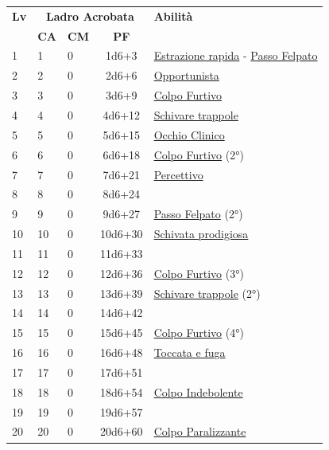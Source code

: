 {\begin{multicols}{2}

\noindent\begin{tabularx}{\linewidth}{p{0.3cm}|p{0.3cm}p{0.3cm}c|X|}
	\toprule
 \rowcolor{gray!20}	\textbf{Lv} & \multicolumn{3}{c|}{\textbf{Ladro Acrobata}} & \textbf{Abilità} \\
& \centering\arraybackslash \textbf{CA} & \centering\arraybackslash \textbf{CM} & \centering\arraybackslash \textbf{PF} & \\
	\toprule
	1 &1	& 0	&	1d6+3	&\hyperlink{Estrazione rapida}{Estrazione rapida} - \hyperlink{Passo Felpato}{Passo Felpato}\\
 \rowcolor{gray!20}2	&	2	& 0	&	2d6+6	&\hyperlink{Opportunista}{Opportunista}\\
	3	&	3	& 0	&	3d6+9	&\hyperlink{Colpo Furtivo}{Colpo Furtivo}\\
 \rowcolor{gray!20}4	&	4	& 0	&	4d6+12	&\hyperlink{Schivare trappole}{Schivare trappole}\\
	5	&	5	& 0	&	5d6+15	&\hyperlink{Occhio Clinico}{Occhio Clinico}\\
 \rowcolor{gray!20}6	&	6	& 0	&	6d6+18	&\hyperlink{Colpo Furtivo}{Colpo Furtivo} (2°)\\
	7	&	7	& 0	&	7d6+21	&\hyperlink{Percettivo}{Percettivo}\\
 \rowcolor{gray!20}8	&	8	& 0	&	8d6+24	&\\
	9	&	9	& 0	&	9d6+27	&\hyperlink{Passo Felpato}{Passo Felpato} (2°)\\
 \rowcolor{gray!20}10	&	10	& 0	&	10d6+30	&\hyperlink{Schivata prodigiosa}{Schivata prodigiosa}\\
	11	&	11	& 0	&	11d6+33	&\\
 \rowcolor{gray!20}12	&	12	& 0	&	12d6+36	&\hyperlink{Colpo Furtivo}{Colpo Furtivo} (3°)\\
	13	&	13	& 0	&	13d6+39	&\hyperlink{Schivare trappole}{Schivare trappole} (2°)\\
 \rowcolor{gray!20}14	&	14	& 0	&	14d6+42	&\\
	15	&	15	& 0	&	15d6+45	&\hyperlink{Colpo Furtivo}{Colpo Furtivo} (4°)\\
 \rowcolor{gray!20}16	&	16	& 0	&	16d6+48	&\hyperlink{Toccata e fuga}{Toccata e fuga}\\
	17	&	17	& 0	&	17d6+51	&\\
 \rowcolor{gray!20}18	&	18	& 0	&	18d6+54	&\hyperlink{Colpo Indebolente}{Colpo Indebolente}\\
	19	&	19	& 0	&	19d6+57	&\\
 \rowcolor{gray!20}20	&	20	& 0	&	20d6+60	&\hyperlink{Colpo Paralizzante}{Colpo Paralizzante}\\
\end{tabularx}


\end{multicols}}
